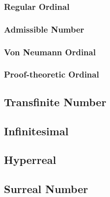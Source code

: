 \subsubsection{Regular Ordinal}\label{sec:regular_ordinal}

\subsubsection{Admissible Number}\label{sec:admissible_ordinal}

\subsubsection{Von Neumann Ordinal}\label{sec:vonneumann_ordinal}

\subsubsection{Proof-theoretic Ordinal}\label{sec:proof_ordinal}



\subsection{Transfinite Number}\label{sec:transfinite_number}

\subsection{Infinitesimal}\label{sec:infinitesimal}

\subsection{Hyperreal}\label{sec:hyperreal}

\subsection{Surreal Number}\label{sec:surreal_number}

